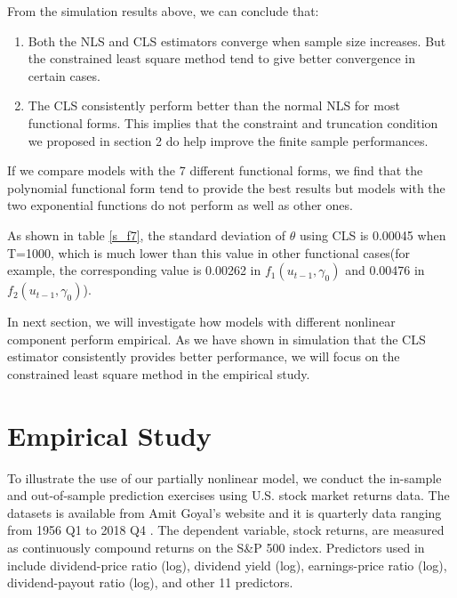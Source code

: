 \documentclass[a4paper,12pt,times,numbered,print,index]{report}
\numberwithin{equation}{section}
\begin{document}
From the simulation results above, we can conclude that:
\begin{enumerate}
    \item Both the NLS and CLS estimators converge when sample size increases. But the constrained least square method tend to give better convergence in certain cases.
    
    \item The CLS consistently perform better than the normal NLS for most functional forms. This implies that the constraint and truncation condition we proposed in section 2 do help improve the finite sample performances. 
\end{enumerate}

If we compare models with the 7 different functional forms,  we find that the polynomial functional form tend to provide the best results but models with the two exponential functions do not perform as well as other ones. 

As shown in table \ref{s_f7}, the standard deviation of $\theta$ using CLS is 0.00045 when T=1000, which is much lower than this value in other functional cases(for example, the corresponding value is 0.00262 in $f_1(u_{t-1}, \gamma_0)$ and 0.00476 in $f_2(u_{t-1}, \gamma_0)$). 

In next section, we will investigate how models with different nonlinear component perform empirical. As we have shown in simulation that the CLS estimator consistently provides better performance, we will focus on the constrained least square method in the empirical study.

\section{Empirical Study}
To illustrate the use of our partially nonlinear model, we conduct the in-sample and out-of-sample prediction exercises using U.S. stock market returns data.
The datasets is available from Amit Goyal's website and it is quarterly data ranging from 1956 Q1 to 2018 Q4 . 
The dependent variable, stock returns, are measured as continuously compound returns on the S\&P 500 index. 
Predictors used in \cite{welch2008comprehensive} include dividend-price ratio (log), dividend yield (log), earnings-price ratio (log), dividend-payout ratio (log), and other 11 predictors. 
\end{document}
